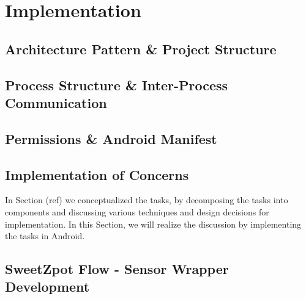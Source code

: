 \chapter{Implementation}

\section{Architecture Pattern \& Project Structure}
\section{Process Structure \& Inter-Process Communication}
\section{Permissions \& Android Manifest}

\section{Implementation of Concerns}
In Section (ref) we conceptualized the tasks, by decomposing the tasks into components and discussing various techniques and design decisions for implementation. In this Section, we will realize the discussion by implementing the tasks in Android. 




\section{SweetZpot Flow - Sensor Wrapper Development}